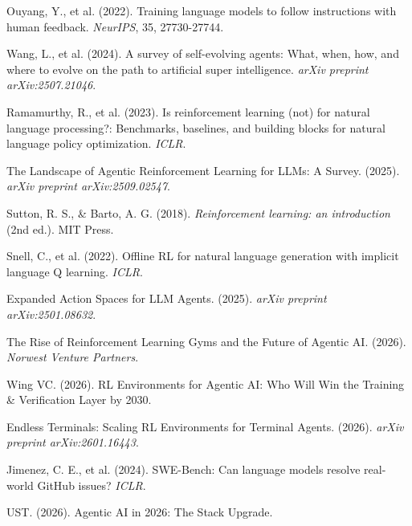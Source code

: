 \documentclass{article}
\begin{document}
\begin{enumerate}[label={[\arabic*]}]
    \item Ouyang, Y., et al. (2022). Training language models to follow instructions with human feedback. \textit{NeurIPS}, 35, 27730-27744.
    
    \item Wang, L., et al. (2024). A survey of self-evolving agents: What, when, how, and where to evolve on the path to artificial super intelligence. \textit{arXiv preprint arXiv:2507.21046}.
    
    \item Ramamurthy, R., et al. (2023). Is reinforcement learning (not) for natural language processing?: Benchmarks, baselines, and building blocks for natural language policy optimization. \textit{ICLR}.
    
    \item The Landscape of Agentic Reinforcement Learning for LLMs: A Survey. (2025). \textit{arXiv preprint arXiv:2509.02547}.
    
    \item Sutton, R. S., \& Barto, A. G. (2018). \textit{Reinforcement learning: an introduction} (2nd ed.). MIT Press.
    
    \item Snell, C., et al. (2022). Offline RL for natural language generation with implicit language Q learning. \textit{ICLR}.
    
    \item Expanded Action Spaces for LLM Agents. (2025). \textit{arXiv preprint arXiv:2501.08632}.
    
    \item The Rise of Reinforcement Learning Gyms and the Future of Agentic AI. (2026). \textit{Norwest Venture Partners}.
    
    \item Wing VC. (2026). RL Environments for Agentic AI: Who Will Win the Training \& Verification Layer by 2030.
    
    \item Endless Terminals: Scaling RL Environments for Terminal Agents. (2026). \textit{arXiv preprint arXiv:2601.16443}.
    
    \item Jimenez, C. E., et al. (2024). SWE-Bench: Can language models resolve real-world GitHub issues? \textit{ICLR}.
    
    \item UST. (2026). Agentic AI in 2026: The Stack Upgrade.
    

\end{enumerate}
\end{document}
